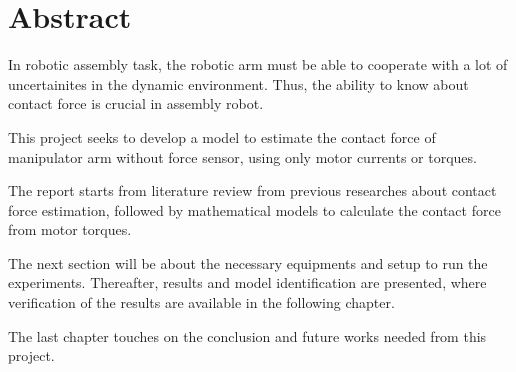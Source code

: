 \chapter*{Abstract}

In robotic assembly task, the robotic arm must be able to cooperate with a lot of uncertainites in the dynamic environment. Thus, the ability to know about contact force is crucial in assembly robot.

This project seeks to develop a model to estimate the contact force of manipulator arm without force sensor, using only motor currents or torques.

The report starts from literature review from previous researches about contact force estimation, followed by mathematical models to calculate the contact force from motor torques. 

The next section will be about the necessary equipments and setup to run the experiments. Thereafter, results and model identification are presented, where verification of the results are available in the following chapter.

The last chapter touches on the conclusion and future works needed from this project.
